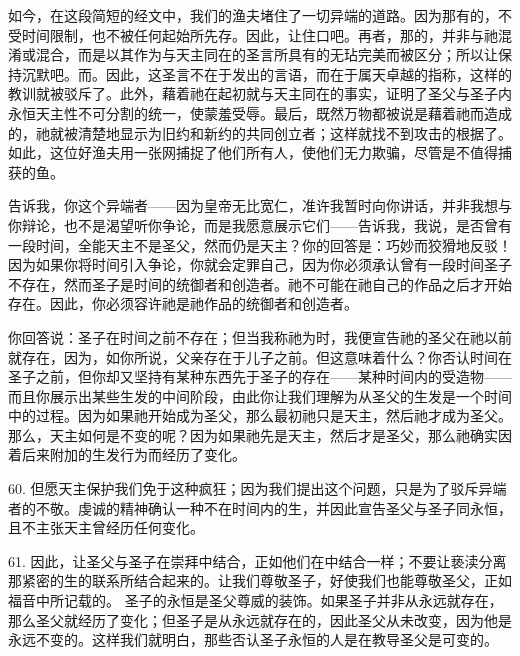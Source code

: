 如今，在这段简短的经文中，我们的渔夫堵住了一切异端的道路。因为那有的，不受时间限制，也不被任何起始所先存。因此，让住口吧。再者，那的，并非与祂混淆或混合，而是以其作为与天主同在的圣言所具有的无玷完美而被区分；所以让保持沉默吧。而。因此，这圣言不在于发出的言语，而在于属天卓越的指称，这样的教训就被驳斥了。此外，藉着祂在起初就与天主同在的事实，证明了圣父与圣子内永恒天主性不可分割的统一，使蒙羞受辱。最后，既然万物都被说是藉着祂而造成的，祂就被清楚地显示为旧约和新约的共同创立者；这样就找不到攻击的根据了。如此，这位好渔夫用一张网捕捉了他们所有人，使他们无力欺骗，尽管是不值得捕获的鱼。\par

\par

告诉我，你这个异端者——因为皇帝无比宽仁，准许我暂时向你讲话，并非我想与你辩论，也不是渴望听你争论，而是我愿意展示它们——告诉我，我说，是否曾有一段时间，全能天主不是圣父，然而仍是天主？你的回答是：巧妙而狡猾地反驳！因为如果你将时间引入争论，你就会定罪自己，因为你必须承认曾有一段时间圣子不存在，然而圣子是时间的统御者和创造者。祂不可能在祂自己的作品之后才开始存在。因此，你必须容许祂是祂作品的统御者和创造者。\par

你回答说：圣子在时间之前不存在；但当我称祂为时，我便宣告祂的圣父在祂以前就存在，因为，如你所说，父亲存在于儿子之前。但这意味着什么？你否认时间在圣子之前，但你却又坚持有某种东西先于圣子的存在——某种时间内的受造物——而且你展示出某些生发的中间阶段，由此你让我们理解为从圣父的生发是一个时间中的过程。因为如果祂开始成为圣父，那么最初祂只是天主，然后祂才成为圣父。那么，天主如何是不变的呢？因为如果祂先是天主，然后才是圣父，那么祂确实因着后来附加的生发行为而经历了变化。\par

60. 但愿天主保护我们免于这种疯狂；因为我们提出这个问题，只是为了驳斥异端者的不敬。虔诚的精神确认一种不在时间内的生，并因此宣告圣父与圣子同永恒，且不主张天主曾经历任何变化。\par

61. 因此，让圣父与圣子在崇拜中结合，正如他们在中结合一样；不要让亵渎分离那紧密的生的联系所结合起来的。让我们尊敬圣子，好使我们也能尊敬圣父，正如福音中所记载的。 圣子的永恒是圣父尊威的装饰。如果圣子并非从永远就存在，那么圣父就经历了变化；但圣子是从永远就存在的，因此圣父从未改变，因为他是永远不变的。这样我们就明白，那些否认圣子永恒的人是在教导圣父是可变的。\par

